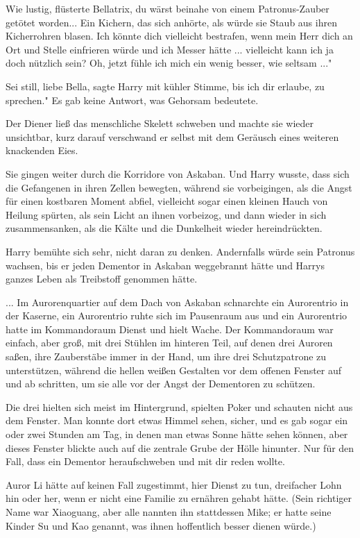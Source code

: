 \glqq{}Wie lustig\grqq{}, flüsterte Bellatrix, \glqq{}du wärst beinahe von einem
Patronus-Zauber getötet worden...\grqq{} Ein Kichern, das sich anhörte, als
würde sie Staub aus ihren Kicherrohren blasen. \glqq{}Ich könnte dich vielleicht
bestrafen, wenn mein Herr dich an Ort und Stelle einfrieren würde und ich Messer
hätte ... vielleicht kann ich ja doch nützlich sein? Oh, jetzt fühle ich mich
ein wenig besser, wie seltsam ..."

\glqq{}Sei still, liebe Bella\grqq{}, sagte Harry mit kühler Stimme, \glqq{}bis
ich dir erlaube, zu sprechen." Es gab keine Antwort, was Gehorsam bedeutete.

Der Diener ließ das menschliche Skelett schweben und machte sie wieder
unsichtbar, kurz darauf verschwand er selbst mit dem Geräusch eines weiteren
knackenden Eies.

Sie gingen weiter durch die Korridore von Askaban. Und Harry wusste, dass sich
die Gefangenen in ihren Zellen bewegten, während sie vorbeigingen, als die Angst
für einen kostbaren Moment abfiel, vielleicht sogar einen kleinen Hauch von
Heilung spürten, als sein Licht an ihnen vorbeizog, und dann wieder in sich
zusammensanken, als die Kälte und die Dunkelheit wieder hereindrückten.

Harry bemühte sich sehr, nicht daran zu denken. Andernfalls würde sein Patronus
wachsen, bis er jeden Dementor in Askaban weggebrannt hätte und Harrys ganzes
Leben als Treibstoff genommen hätte.

... Im Aurorenquartier auf dem Dach von Askaban schnarchte ein Aurorentrio in
der Kaserne, ein Aurorentrio ruhte sich im Pausenraum aus und ein Aurorentrio
hatte im Kommandoraum Dienst und hielt Wache. Der Kommandoraum war einfach, aber
groß, mit drei Stühlen im hinteren Teil, auf denen drei Auroren saßen, ihre
Zauberstäbe immer in der Hand, um ihre drei Schutzpatrone zu unterstützen,
während die hellen weißen Gestalten vor dem offenen Fenster auf und ab
schritten, um sie alle vor der Angst der Dementoren zu schützen.

Die drei hielten sich meist im Hintergrund, spielten Poker und schauten nicht
aus dem Fenster. Man konnte dort etwas Himmel sehen, sicher, und es gab sogar
ein oder zwei Stunden am Tag, in denen man etwas Sonne hätte sehen können, aber
dieses Fenster blickte auch auf die zentrale Grube der Hölle hinunter. Nur für
den Fall, dass ein Dementor heraufschweben und mit dir reden wollte.

Auror Li hätte auf keinen Fall zugestimmt, hier Dienst zu tun, dreifacher Lohn
hin oder her, wenn er nicht eine Familie zu ernähren gehabt hätte. (Sein
richtiger Name war Xiaoguang, aber alle nannten ihn stattdessen Mike; er hatte
seine Kinder Su und Kao genannt, was ihnen hoffentlich besser dienen würde.)

